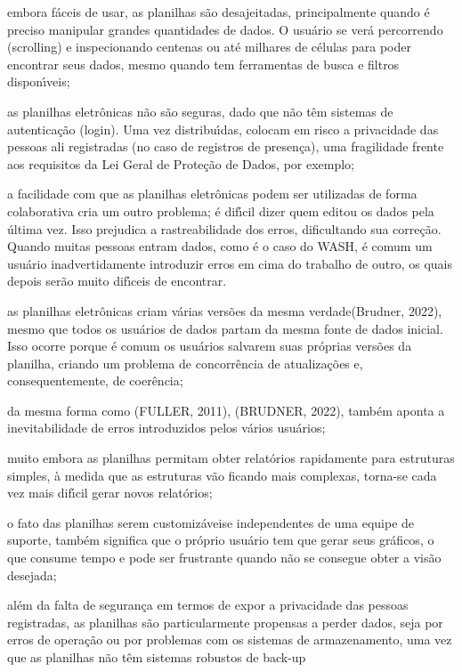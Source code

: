 \documentclass[
12pt,		%
openright,	%
twoside,  %
a4paper,			%
chapter=TITLE,		%
english,			%
french,				%
spanish,			%
brazil				%
]{USPSC-classe/USPSC}
\begin{document}
\begin{alineas}
\item embora f\'aceis de usar, as planilhas s\~ao desajeitadas, principalmente quando \'e preciso manipular grandes quantidades de dados. O usu\'ario se ver\'a percorrendo (scrolling) e inspecionando centenas ou at\'e milhares de c\'elulas para poder encontrar seus dados, mesmo quando tem ferramentas de busca e filtros dispon\'{\i}veis;
\item as planilhas eletr\^onicas n\~ao s\~ao seguras, dado que n\~ao t\^em sistemas de autentica\c{c}\~ao (login). Uma vez distribu\'{\i}das, colocam em risco a privacidade das pessoas ali registradas (no caso de registros de presen\c{c}a), uma fragilidade frente aos requisitos da Lei Geral de Prote\c{c}\~ao de Dados, por exemplo;
\item a facilidade com que as planilhas eletr\^onicas podem ser utilizadas de forma colaborativa cria um outro problema; \'e dif\'{\i}cil dizer quem editou os dados pela \'ultima vez. Isso prejudica a rastreabilidade dos erros, dificultando sua corre\c{c}\~ao. Quando muitas pessoas entram dados, como \'e o caso do WASH, \'e comum um usu\'ario inadvertidamente introduzir erros em cima do trabalho de outro, os quais depois ser\~ao muito dif\'{\i}ceis de encontrar.
\item as planilhas eletr\^onicas criam v\'arias vers\~oes da mesma \textquotedbl verdade\textquotedbl   (Brudner, 2022), mesmo que todos os usu\'arios de dados partam da mesma fonte de dados inicial. Isso ocorre porque \'e comum os usu\'arios salvarem suas pr\'oprias vers\~oes da planilha, criando um problema de concorr\^encia de atualiza\c{c}\~oes e, consequentemente, de coer\^encia;
\item da mesma forma como (FULLER, 2011),  (BRUDNER, 2022), tamb\'em aponta a inevitabilidade de erros introduzidos pelos v\'arios usu\'arios;
\item muito embora as planilhas permitam obter relat\'orios rapidamente para estruturas simples, \`a medida que as estruturas v\~ao ficando mais complexas, torna-se cada vez mais dif\'{\i}cil gerar novos relat\'orios;
\item o fato das planilhas serem \textquotedbl customiz\'aveis\textquotedbl  e independentes de uma equipe de suporte, tamb\'em significa que o pr\'oprio usu\'ario tem que gerar seus gr\'aficos, o que consume tempo e pode ser frustrante quando n\~ao se consegue obter a vis\~ao desejada;
\item al\'em da falta de seguran\c{c}a em termos de expor a privacidade das pessoas registradas, as planilhas s\~ao particularmente propensas a perder dados, seja por erros de opera\c{c}\~ao ou por problemas com os sistemas de armazenamento, uma vez que as planilhas n\~ao t\^em sistemas robustos de \textquotedbl back-up\textquotedbl 

\end{alineas}
\end{document}
